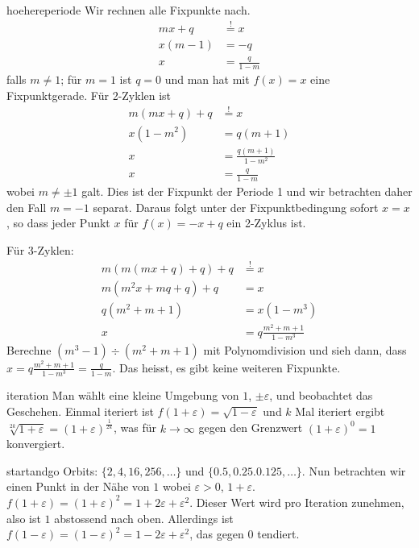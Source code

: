 \documentclass[%
<<<<<<< Updated upstream
11pt,%
twoside,%
titlepage,%
german,%
headsepline%
]{scrartcl}
\begin{document}
\begin{lsg}{hoehereperiode}
Wir rechnen alle Fixpunkte nach.
\begin{align*}
mx+q &\stackrel{!}{=} x\\
x(m-1) &= -q\\
x &= \frac{q}{1-m}
\end{align*}
falls $m\neq1$; für $m=1$ ist $q=0$ und man hat mit $f(x)=x$ eine Fixpunktgerade. Für 2-Zyklen ist
\begin{align*}
m(mx+q)+q &\stackrel{!}{=} x\\
x(1-m^2) &= q(m+1)\\
x &= \frac{q(m+1)}{1-m^2}\\
x &= \frac{q}{1-m}
\end{align*}
wobei $m\neq\pm1$ galt. Dies ist der Fixpunkt der Periode 1 und wir betrachten daher den Fall $m=-1$ separat. Daraus folgt unter der Fixpunktbedingung sofort $x=x$, so dass jeder Punkt $x$ für $f(x)=-x+q$ ein 2-Zyklus ist.

Für 3-Zyklen:
\begin{align*}
m(m(mx+q)+q)+q &\stackrel{!}{=} x\\
m(m^2x+mq+q)+q &= x\\
q(m^2+m+1) &= x(1-m^3)\\
x &= q\frac{m^2+m+1}{1-m^3}
\end{align*}
Berechne $(m^3-1)\div(m^2+m+1)$ mit Polynomdivision und sieh dann, dass $x= q\frac{m^2+m+1}{1-m^3}=\frac{q}{1-m}$. Das heisst, es gibt keine weiteren Fixpunkte.
\end{lsg}
\begin{lsg}{iteration}
Man wählt eine kleine Umgebung von $1$, $\pm\varepsilon$, und beobachtet das Geschehen. Einmal iteriert ist $f(1+\varepsilon)=\sqrt{1-\varepsilon}$ und $k$ Mal iteriert ergibt $\sqrt[2k]{1+\varepsilon}=(1+\varepsilon)^{\frac{1}{2k}}$, was für $k\to\infty$ gegen den Grenzwert $(1+\varepsilon)^{0}=1$ konvergiert.
\end{lsg}
\begin{lsg}{startandgo}
Orbits: $\{2,4,16,256,\dots\}$ und $\{0.5,0.25.0.125,\dots\}$. Nun betrachten wir einen Punkt in der Nähe von $1$ wobei $\varepsilon>0$, $1+\varepsilon$. $f(1+\varepsilon)=(1+\varepsilon)^2=1+2\varepsilon+\varepsilon^2$. Dieser Wert wird pro Iteration zunehmen, also ist $1$ abstossend nach oben. Allerdings ist $f(1-\varepsilon)=(1-\varepsilon)^2=1-2\varepsilon+\varepsilon^2$, das gegen $0$ tendiert.
\end{lsg}
\end{document}
